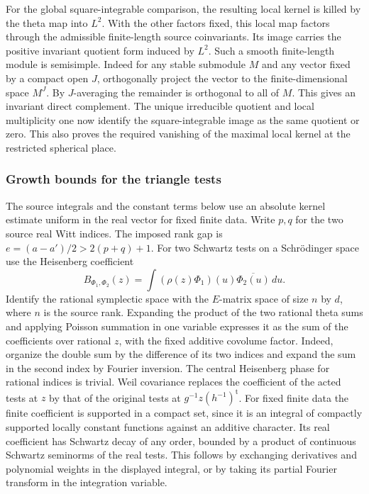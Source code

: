 For the global square-integrable comparison, the resulting local
kernel is killed by the theta map into \(L^2\). With the other
factors fixed, this local map factors through the admissible
finite-length source coinvariants. Its image carries the positive
invariant quotient form induced by \(L^2\). Such a smooth
finite-length module is semisimple. Indeed for any stable
submodule \(M\) and any vector fixed by a compact open \(J\),
orthogonally project the vector to the finite-dimensional
space \(M^J\). By \(J\)-averaging the remainder is orthogonal
to all of \(M\). This gives an invariant direct complement.
The unique irreducible quotient and local multiplicity one
now identify the square-integrable image as the same quotient
or zero. This also proves the required vanishing of the maximal
local kernel at the restricted spherical place.

\subsubsection{Growth bounds for the triangle tests}
The source integrals and the constant terms below use an absolute
kernel estimate uniform in the real vector for fixed finite data.
Write \(p,q\) for the two source real Witt indices. The imposed
rank gap is \(e=(a-a')/2>2(p+q)+1\). For two Schwartz tests on a Schr\"odinger
space use the Heisenberg coefficient
\[
 B_{\Phi_1,\Phi_2}(z)
    =\int (\rho(z)\Phi_1)(u)\overline{\Phi_2(u)}\,du.
\]
Identify the rational symplectic space with the \(E\)-matrix space
of size \(n\) by \(d\), where \(n\) is the source rank. Expanding
the product of the two rational theta sums and applying Poisson
summation in one variable expresses it as the sum of the coefficients
over rational \(z\), with the fixed additive covolume factor. Indeed,
organize the double sum by the difference of its two indices and
expand the sum in the second index by Fourier inversion. The central
Heisenberg phase for rational indices is trivial. Weil covariance
replaces the coefficient of the acted tests at \(z\) by that of
the original tests at \(g^{-1}z(h^{-1})^{\mathrm t}\). For fixed
finite data the finite coefficient is supported in a compact set,
since it is an integral of compactly supported locally constant
functions against an additive character. Its real coefficient has
Schwartz decay of any order, bounded by a product of continuous
Schwartz seminorms of the real tests. This follows by exchanging
derivatives and polynomial weights in the displayed integral, or by
taking its partial Fourier transform in the integration variable.


